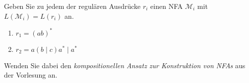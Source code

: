 \begin{exercise}

Geben Sie zu jedem der regulären Ausdrücke $r_i$ einen 
NFA $\mathcal M_i$ mit $L(\mathcal M_i)=L(r_i)$ an.

\begin{enumerate}
  \item $r_1 = (ab)^*$
  \item $r_2 = a(b \mid c)a^* \mid a^*$
\end{enumerate}

Wenden Sie dabei den {\emph{kompositionellen Ansatz zur Konstruktion von NFAs}} 
aus der Vorlesung an.

\end{exercise}

